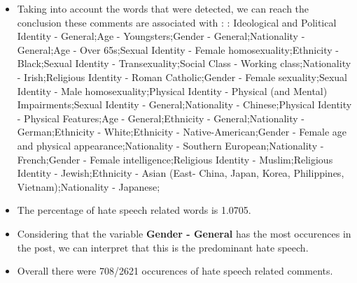 \documentclass[11pt]{article}
\begin{document}
\begin{itemize}\item Taking into account the words that were detected, we can reach the conclusion these comments are associated with : :  Ideological and Political Identity - General;Age - Youngsters;Gender - General;Nationality - General;Age - Over 65s;Sexual Identity - Female homosexuality;Ethnicity - Black;Sexual Identity - Transexuality;Social Class - Working class;Nationality - Irish;Religious Identity - Roman Catholic;Gender - Female sexuality;Sexual Identity - Male homosexuality;Physical Identity - Physical (and Mental) Impairments;Sexual Identity - General;Nationality - Chinese;Physical Identity - Physical Features;Age - General;Ethnicity - General;Nationality - German;Ethnicity - White;Ethnicity - Native-American;Gender - Female age and physical appearance;Nationality - Southern European;Nationality - French;Gender - Female intelligence;Religious Identity - Muslim;Religious Identity - Jewish;Ethnicity - Asian (East- China, Japan, Korea, Philippines, Vietnam);Nationality - Japanese;%

\item The percentage of hate speech related words is 1.0705.

\item Considering that the variable \textbf{Gender - General} has the most occurences in the post, we can interpret that this is the predominant hate speech.

\item Overall there were 708/2621 occurences of hate speech related comments.\end{itemize}
\end{document}

